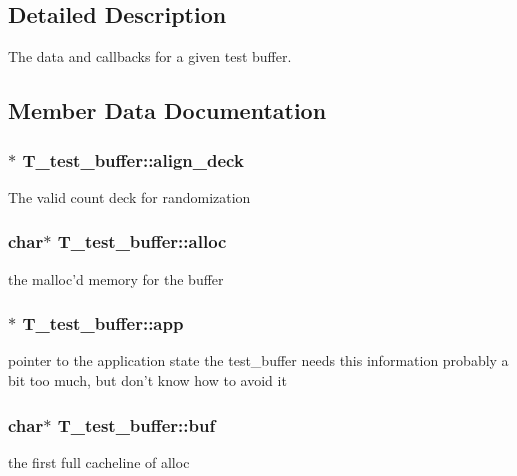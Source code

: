 \subsection{Detailed Description}
The data and callbacks for a given test buffer.



\subsection{Member Data Documentation}
\subsubsection{$\ast$ T\_\-test\_\-buffer::align\_\-deck}\label{structT__test__buffer_m13}


The valid count deck for randomization 
\subsubsection{\setlength{\rightskip}{0pt plus 5cm}char$\ast$ T\_\-test\_\-buffer::alloc}\label{structT__test__buffer_m8}


the malloc'd memory for the buffer 
\subsubsection{$\ast$ T\_\-test\_\-buffer::app}\label{structT__test__buffer_m0}


pointer to the application state the test\_\-buffer needs this information probably a bit too much, but don't know how to avoid it 
\subsubsection{\setlength{\rightskip}{0pt plus 5cm}char$\ast$ T\_\-test\_\-buffer::buf}\label{structT__test__buffer_m10}


the first full cacheline of alloc 
